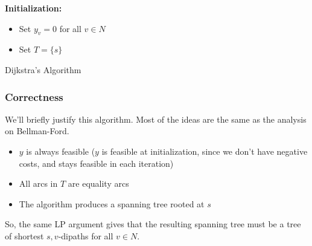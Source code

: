 \IncMargin{1em}
\begin{algorithm}[H]\label{alg:ford}  
  \nl \textbf{Initialization:}
  \begin{itemize}
      \item Set $y_v = 0$ for all $v \in N$ 
      \item Set $T = \{s\}$
  \end{itemize}

  \nl {}

  \caption{Dijkstra's Algorithm}
\end{algorithm}

\subsubsection{Correctness}
We'll briefly justify this algorithm. Most of the ideas are the same as the analysis on Bellman-Ford. 
\begin{itemize}
    \item $y$ is always feasible ($y$ is feasible at initialization, since we don't have negative costs, and stays feasible in each iteration)
    \item All arcs in $T$ are equality arcs
    \item The algorithm produces a spanning tree rooted at $s$
\end{itemize}
So, the same LP argument gives that the resulting spanning tree must be a tree of shortest $s,v$-dipaths for all $v \in N$.

